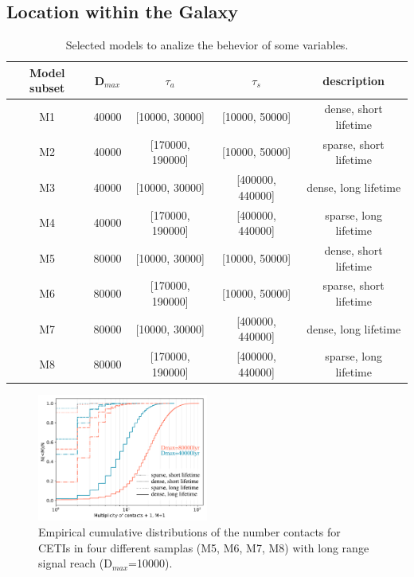 \documentclass[crop]{CSLB}%
\begin{document}


\subsection{Location within the Galaxy}




 
\setlength{\tabcolsep}{10pt}
\begin{table}
\centering
\begin{tabular}{ccccc}
\hline
Model subset & D$_{max}$ & $\tau_a$ & $\tau_s$ & description  \\
\hline
M1 & 40000 & [10000, 30000]   & [10000, 50000]   &dense, short lifetime\\
M2 & 40000 & [170000, 190000] & [10000, 50000]   &sparse, short lifetime\\
M3 & 40000 & [10000, 30000]   & [400000, 440000] &dense, long lifetime \\
M4 & 40000 & [170000, 190000] & [400000, 440000] &sparse, long lifetime\\

M5 & 80000 & [10000, 30000]   & [10000, 50000]   &dense, short lifetime\\
M6 & 80000 & [170000, 190000] & [10000, 50000]   &sparse, short lifetime\\
M7 & 80000 & [10000, 30000]   & [400000, 440000] &dense, long lifetime \\
M8 & 80000 & [170000, 190000] & [400000, 440000] &sparse, long lifetime\\

\hline
\end{tabular}
\caption{Selected models to analize the behevior of some variables.}
\label{T_SelectedModels}
\end{table}



  
\begin{figure} \centering
   \includegraphics[width=0.5\textwidth]{F1.pdf}
   \caption{Empirical cumulative distributions of the number contacts
   for CETIs in four different samplas (M5, M6, M7, M8) with long
   range signal reach (D$_{max}$=10000).
   }
\label{F_res_1} \end{figure}
   
\end{document}
